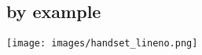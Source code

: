 \subsection{\langname{} by example}
\label{sec:references_constraints}

\begin{figure*}[!ht]
\centering
\texttt{[image: images/handset\_lineno.png]}




\end{figure*}
